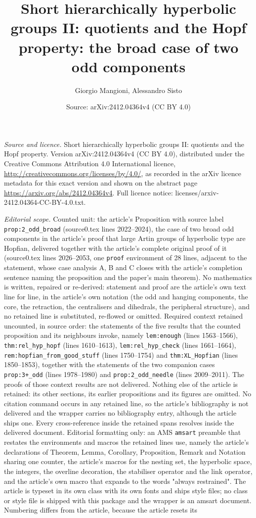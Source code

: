 \documentclass[10pt,a4paper]{amsart}
\title[Short HHG II]{Short hierarchically hyperbolic groups II: quotients and the Hopf property: the broad case of two odd components}
\author{Giorgio Mangioni, Alessandro Sisto}
\date{Source: arXiv:2412.04364v4 (CC BY 4.0)}
\theoremstyle{plain}
\begin{document}
\maketitle
\noindent\emph{Source and licence.} Short hierarchically hyperbolic groups II: quotients and the Hopf property. Version arXiv:2412.04364v4 (CC BY 4.0), distributed under the Creative Commons Attribution 4.0 International licence, \url{http://creativecommons.org/licenses/by/4.0/}, as recorded in the arXiv licence metadata for this exact version and shown on the abstract page \url{https://arxiv.org/abs/2412.04364v4}. Full licence notice: licenses/arxiv-2412.04364-CC-BY-4.0.txt.\par\smallskip

\noindent\textit{Editorial scope.} Counted unit: the article's Proposition with source label \texttt{prop:2\_odd\_broad} (source0.tex lines 2022--2024), the case of two broad odd components in the article's proof that large Artin groups of hyperbolic type are Hopfian, delivered together with the article's complete original proof of it (source0.tex lines 2026--2053, one \texttt{proof} environment of 28 lines, adjacent to the statement, whose case analysis A, B and C closes with the article's completion sentence naming the proposition and the paper's main theorem). No mathematics is written, repaired or re-derived: statement and proof are the article's own text line for line, in the article's own notation (the odd and hanging components, the core, the retraction, the centralisers and dihedrals, the peripheral structure), and no retained line is substituted, re-flowed or omitted. Required context retained uncounted, in source order: the statements of the five results that the counted proposition and its neighbours invoke, namely \texttt{lem:enough} (lines 1563--1566), \texttt{thm:rel\_hyp\_hopf} (lines 1610--1613), \texttt{lem:rel\_hyp\_check} (lines 1661--1664), \texttt{rem:hopfian\_from\_good\_stuff} (lines 1750--1754) and \texttt{thm:XL\_Hopfian} (lines 1850--1853), together with the statements of the two companion cases \texttt{prop:3+\_odd} (lines 1978--1980) and \texttt{prop:2\_odd\_needle} (lines 2009--2011). The proofs of those context results are not delivered. Nothing else of the article is retained: its other sections, its earlier propositions and its figures are omitted. No citation command occurs in any retained line, so the article's bibliography is not delivered and the wrapper carries no bibliography entry, although the article ships one. Every cross-reference inside the retained spans resolves inside the delivered document. Editorial formatting only: an AMS \texttt{amsart} preamble that restates the environments and macros the retained lines use, namely the article's declarations of Theorem, Lemma, Corollary, Proposition, Remark and Notation sharing one counter, the article's macros for the nesting set, the hyperbolic space, the integers, the overline decoration, the stabiliser operator and the link operator, and the article's own macro that expands to the words "always restrained". The article is typeset in its own class with its own fonts and ships style files; no class or style file is shipped with this package and the wrapper is an amsart document. Numbering differs from the article, because the article resets its 
\end{document}
